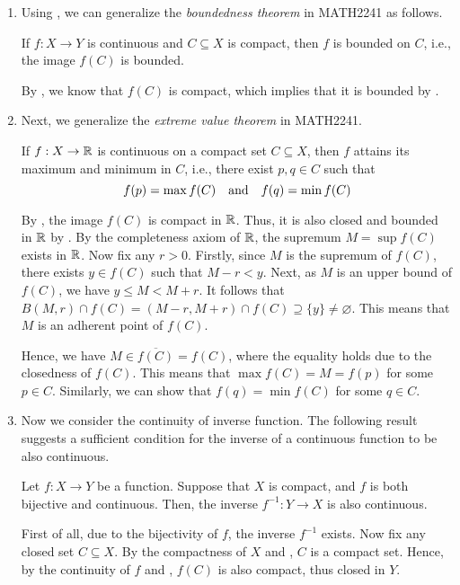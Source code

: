 \begin{enumerate}
\item Using , we can generalize the
\emph{boundedness theorem} in MATH2241 as follows.
\begin{corollary}
\label{cor:cts-cpt-bounded}
If \(f:X\to Y\) is continuous and \(C\subseteq X\) is compact, then \(f\) is
bounded on \(C\), i.e., the image \(f(C)\) is bounded.
\end{corollary}
\begin{pf}
By , we know that \(f(C)\) is compact, which
implies that it is bounded by .
\end{pf}

\item Next, we generalize the \emph{extreme value theorem} in MATH2241.

\begin{theorem}
\label{thm:cts-cpt-evt}
If \(f:X\to\mathbb{R}\) is continuous on a compact set \(C\subseteq X\), then \(f\)
attains its maximum and minimum in \(C\), i.e., there exist \(p,q\in C\) such that
\[
f(p)=\max f(C)
\qqtext{and}
f(q)=\min f(C)
\]
\end{theorem}
\begin{pf}
By , the image \(f(C)\) is compact in \(\mathbb{R}\).
Thus, it is also closed and bounded in \(\mathbb{R}\) by
. By the completeness axiom of \(\mathbb{R}\), the
supremum \(M=\sup f(C)\) exists in \(\mathbb{R}\). Now fix any \(r>0\). Firstly, since
\(M\) is the supremum of \(f(C)\), there exists \(y\in f(C)\) such that
\(M-r<y\). Next, as \(M\) is an upper bound of \(f(C)\), we have \(y\le
M<M+r\). It follows that \(B(M,r)\cap f(C)=(M-r,M+r)\cap f(C)\supseteq
\{y\}\ne\varnothing\). This means that \(M\) is an adherent point of \(f(C)\).

Hence, we have \(M\in\overline{f(C)}=f(C)\), where the equality holds due to the
closedness of \(f(C)\). This means that \(\max f(C)=M=f(p)\) for some \(p\in
C\).  Similarly, we can show that \(f(q)=\min f(C)\) for some \(q\in C\).

\end{pf}

\item Now we consider the continuity of inverse function. The following result
suggests a sufficient condition for the inverse of a continuous function to be
also continuous.

\begin{proposition}
\label{prp:cts-fn-inv-cts}
Let \(f:X\to Y\) be a function. Suppose that \(X\) is compact, and \(f\) is
both bijective and continuous. Then, the inverse \(f^{-1}:Y\to X\) is also
continuous.
\end{proposition}
\begin{pf}
First of all, due to the bijectivity of \(f\), the inverse \(f^{-1}\) exists.
Now fix any closed set \(C\subseteq X\). By the compactness of \(X\) and
, \(C\) is a compact set. Hence, by the
continuity of \(f\) and , \(f(C)\) is also
compact, thus closed in \(Y\).


\end{pf}
\end{enumerate}
